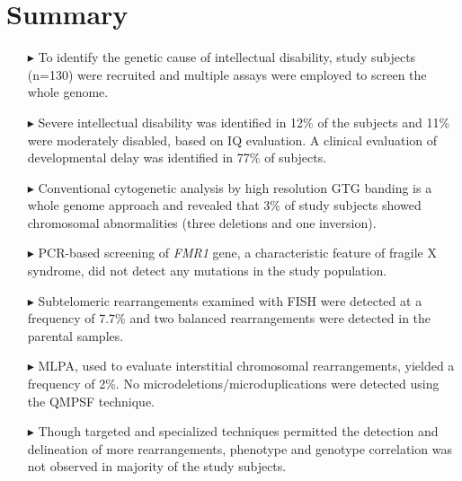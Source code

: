 \chapter*{Summary}

\begin{itemize}

\item[$\blacktriangleright$] To identify the genetic cause of intellectual disability, study subjects (n=130) were recruited and multiple assays were employed to screen the whole genome.

\item[$\blacktriangleright$] Severe intellectual disability was identified in 12\% of the subjects and 11\% were moderately disabled, based on IQ evaluation. A clinical evaluation of developmental delay was identified in 77\% of subjects.

\item[$\blacktriangleright$] Conventional cytogenetic analysis by high resolution GTG banding is a whole genome approach and revealed that 3\% of study subjects showed chromosomal abnormalities (three deletions and one inversion).

\item[$\blacktriangleright$] PCR-based screening of \textit{FMR1} gene, a characteristic feature of fragile X syndrome, did not detect any mutations in the study population.

\item[$\blacktriangleright$] Subtelomeric rearrangements examined with FISH were detected at a frequency of 7.7\% and two balanced rearrangements were detected in the parental samples.

\item[$\blacktriangleright$] MLPA, used to evaluate interstitial chromosomal rearrangements, yielded a frequency of 2\%. No microdeletions/microduplications were detected using the QMPSF technique.

\item[$\blacktriangleright$] Though targeted and specialized techniques permitted the detection and delineation of more rearrangements, phenotype and genotype correlation was not observed in majority of the study subjects.

\end{itemize}
